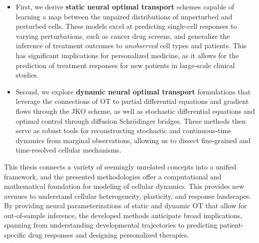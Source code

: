 \begin{itemize}[leftmargin=*]
	\item First, we derive \textbf{static neural optimal transport} schemes capable of learning a map between the unpaired distributions of unperturbed and perturbed cells. These models excel at predicting single-cell responses to varying perturbations, such as cancer drug screens, and generalize the inference of treatment outcomes to \emph{unobserved} cell types and patients.
This has significant implications for personalized medicine, as it allows for the prediction of treatment responses for new patients in large-scale clinical studies.

	\item Second, we explore \textbf{dynamic neural optimal transport} formulations that leverage the connections of OT to partial differential equations and gradient flows through the \acrfull{JKO} scheme, as well as stochastic differential equations and optimal control through diffusion Schr{\"o}dinger bridges. These methods then serve as robust tools for reconstructing stochastic and continuous-time dynamics from marginal observations, allowing us to dissect fine-grained and time-resolved cellular mechanisms.
\end{itemize}

This thesis connects a variety of seemingly unrelated concepts into a unified framework, and the presented methodologies offer a computational and mathematical foundation for modeling of cellular dynamics. This provides new avenues to understand cellular heterogeneity, plasticity, and response landscapes.
By providing neural parameterizations of static and dynamic OT that allow for out-of-sample inference, the developed methods anticipate broad implications, spanning from understanding developmental trajectories to predicting patient-specific drug responses and designing personalized therapies.

\endgroup

\cleardoublepage%

\begingroup
\let\clearpage\relax
\let\cleardoublepage\relax
\let\cleardoublepage\relax


